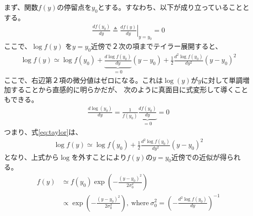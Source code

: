 \documentclass[oneside,onecolumn]{jlreq}
\theoremstyle{plain}
\begin{document}
まず、関数$f\left(y\right)$の停留点を$y_0$とする。すなわち、以下が成り立っていることとする。
\begin{align}
    \frac{df\left(y_0\right)}{dy} \triangleq \left. \frac{df\left(y\right)}{dy}\right|_{y=y_0} = 0
\end{align}
ここで、$\log f\left(y\right)$ を$y=y_0$近傍で２次の項までテイラー展開すると、
\begin{align}
    \log f\left(y\right) \simeq \log f\left(y_0\right) +
    \underbrace{\frac{d\log f\left(y_0\right)}{dy}}_{=0}\left(y-y_0\right) +
    \frac{1}{2}\frac{d^2\log f\left(y_0\right)}{dy^2}\left(y-y_0\right)^2
    \label{eq:taylor}
\end{align}
ここで、右辺第２項の微分値はゼロになる。これは$\log\left(y\right)$が$y$に対して単調増加することから直感的に明らかだが、
次のように真面目に式変形して導くこともできる。
\begin{align}
    \frac{d\log\left(y_0\right)}{dy} =
    \frac{1}{f\left(y_0\right)}\underbrace{\frac{df\left(y_0\right)}{dy}}_{=0} = 0
\end{align}
つまり、式\eqref{eq:taylor}は、
\begin{align}
    \log f\left(y\right) \simeq \log f\left(y_0\right) +
    \frac{1}{2}\frac{d^2\log f\left(y_0\right)}{dy^2}\left(y-y_0\right)^2
\end{align}
となり、上式から$\log$を外すことにより$f\left(y\right)$の$y=y_0$近傍での近似が得られる。
\begin{align}
    f\left(y\right) &\simeq f\left(y_0\right)\exp\left(-\frac{(y-y_0)^2}{2\sigma_0^2}\right) \\
    &\propto \exp\left(-\frac{(y-y_0)^2}{2\sigma_0^2}\right),~\textrm{where}~\sigma_0^2=\left(-\frac{d^2\log f\left(y_0\right)}{dy}\right)^{-1}
\end{align}
\end{document}

